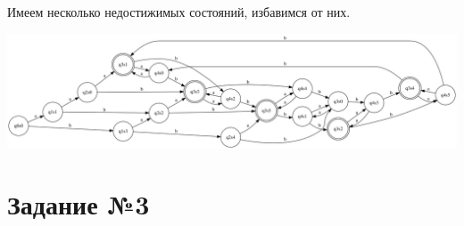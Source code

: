 \documentclass[a4paper,12pt]{article}
\begin{document}
Имеем несколько недостижимых состояний, избавимся от них.\newline
\begin{center}
\includegraphics[width=1.15\textwidth]{2_5_1}\newline
\end{center}

\section*{\Huge Задание №3}
\end{document}
